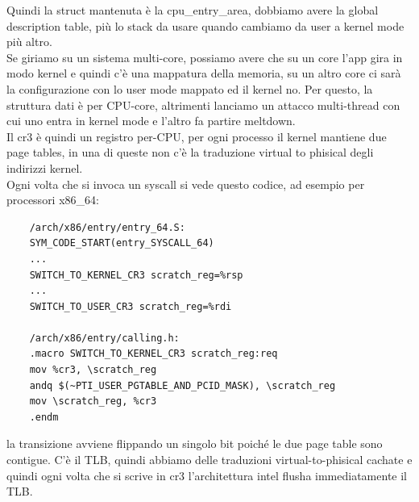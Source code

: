 \documentclass[12pt, oneside]{extbook} %
\begin{document}
Quindi la struct mantenuta è la \textsf{cpu\_entry\_area}, dobbiamo avere la global description table, più lo stack da usare quando cambiamo da user a kernel mode più altro.\\
Se giriamo su un sistema multi-core, possiamo avere che su un core l'app gira in modo kernel e quindi c'è una mappatura della memoria, su un altro core ci sarà la configurazione con lo user mode mappato ed il kernel no. Per questo, la struttura dati è per CPU-core, altrimenti lanciamo un attacco multi-thread con cui uno entra in kernel mode e l'altro fa partire meltdown.\\ Il cr3 è quindi un registro per-CPU, per ogni processo il kernel mantiene due page tables, in una di queste non c'è la traduzione virtual to phisical degli indirizzi kernel.\\ Ogni volta che si invoca un syscall si vede questo codice, ad esempio per processori x86\_64:
\begin{lstlisting}
	/arch/x86/entry/entry_64.S:
	SYM_CODE_START(entry_SYSCALL_64)
	...
	SWITCH_TO_KERNEL_CR3 scratch_reg=%rsp
	...
	SWITCH_TO_USER_CR3 scratch_reg=%rdi
	
	/arch/x86/entry/calling.h:
	.macro SWITCH_TO_KERNEL_CR3 scratch_reg:req
	mov %cr3, \scratch_reg
	andq $(~PTI_USER_PGTABLE_AND_PCID_MASK), \scratch_reg
	mov \scratch_reg, %cr3
	.endm
\end{lstlisting}
la transizione avviene flippando un singolo bit poiché le due page table sono contigue. C'è il TLB, quindi abbiamo delle traduzioni virtual-to-phisical cachate e quindi ogni volta che si scrive in cr3 l'architettura intel flusha immediatamente il TLB.
\end{document}
